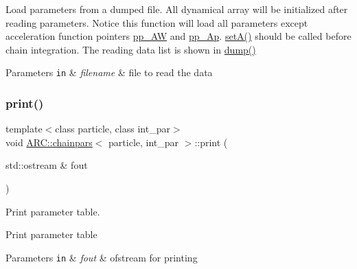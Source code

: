 Load parameters from a dumped file. All dynamical array will be initialized after reading parameters. Notice this function will load all parameters except acceleration function pointers \hyperlink{classARC_1_1chainpars_a1f5e1a080b4f7f81cadd1ec1058fba5b}{pp\+\_\+\+AW} and \hyperlink{classARC_1_1chainpars_a0eb053974e399ff5c23c98069692c250}{pp\+\_\+\+Ap}. \hyperlink{classARC_1_1chainpars_a3636273acac1bb08f2fbccc44568ce9a}{set\+A()} should be called before chain integration. The reading data list is shown in \hyperlink{classARC_1_1chainpars_aa74f5c25fdd13f5bccc4efbee672dd44}{dump()} 
\begin{DoxyParams}[1]{Parameters}
\mbox{\tt in}  & {\em filename} & file to read the data \\
\hline
\end{DoxyParams}
\hypertarget{classARC_1_1chainpars_a69e926aea002e117e14bb8122537c329}{}\label{classARC_1_1chainpars_a69e926aea002e117e14bb8122537c329} 
\subsubsection{\texorpdfstring{print()}{print()}}
{\footnotesize\ttfamily template$<$class particle, class int\+\_\+par$>$ \\
void \hyperlink{classARC_1_1chainpars}{A\+R\+C\+::chainpars}$<$ particle, int\+\_\+par $>$\+::print (\begin{DoxyParamCaption}\item[{std\+::ostream \&}]{fout }\end{DoxyParamCaption})\hspace{0.3cm}{\ttfamily [inline]}}



Print parameter table. 

Print parameter table 
\begin{DoxyParams}[1]{Parameters}
\mbox{\tt in}  & {\em fout} & ofstream for printing \\
\hline
\end{DoxyParams}
\hypertarget{classARC_1_1chainpars_a3636273acac1bb08f2fbccc44568ce9a}{}\label{classARC_1_1chainpars_a3636273acac1bb08f2fbccc44568ce9a} 
